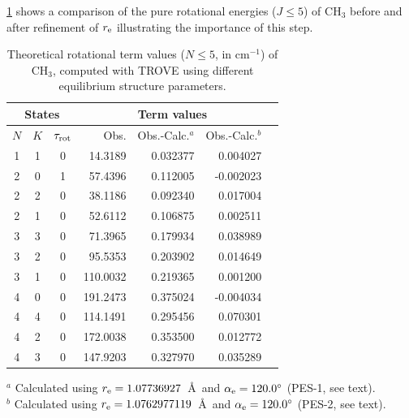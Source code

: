 \documentclass{achemso}
\newcommand{\3}{$_{3}$}
\newcommand{\cm}{cm$^{-1}$}
\begin{document}
\ref{t:rot:energies} shows a comparison of the pure rotational energies ($J\le 5$) of CH$_3$ before and after refinement of $r_{\rm e}$ illustrating the importance of this step.



\begin{table}
\caption{\label{t:rot:energies}  Theoretical rotational term
values ($N\le 5$, in \cm) of CH$_3$, computed with TROVE using different
equilibrium structure parameters.}
\begin{center}
\renewcommand{\arraystretch}{0.95}
\begin{tabular}{cccrrrr}
\hline
\hline
\multicolumn{3}{c}{States}  &   \multicolumn{3}{c}{Term values}          \\
\hline
$N$   &  $K$   &$\tau_{\rm rot}$ &  Obs. &  Obs.-Calc.$^a$& Obs.-Calc.$^b$ \\
\hline
1   &   1    &    0    &  14.3189 & 0.032377 &  0.004027 \\
2   &   0    &    1    &  57.4396 & 0.112005 & -0.002023 \\
2   &   2    &    0    &  38.1186 & 0.092340 &  0.017004 \\
2   &   1    &    0    &  52.6112 & 0.106875 &  0.002511 \\
3   &   3    &    0    &  71.3965 & 0.179934 &  0.038989 \\
3   &   2    &    0    &  95.5353 & 0.203902 &  0.014649 \\
3   &   1    &    0    & 110.0032 & 0.219365 &  0.001200 \\
4   &   0    &    0    & 191.2473 & 0.375024 & -0.004034 \\
4   &   4    &    0    & 114.1491 & 0.295456 &  0.070301 \\
4   &   2    &    0    & 172.0038 & 0.353500 &  0.012772 \\
4   &   3    &    0    & 147.9203 & 0.327970 &  0.035289 \\
\hline
\end{tabular}
\end{center}
\begin{flushleft}
\noindent \vspace*{0.1truecm}
$^a$ {Calculated using $r_{\rm e} = 1.07736927$~\AA\ and $\alpha_{\rm e}= 120.0^\circ$ (PES-1, see text).} \\
\noindent \vspace*{0.1truecm}
$^b$ {Calculated using $r_{\rm e} = 1.0762977119$~\AA\ and $\alpha_{\rm e}=120.0^\circ$ (PES-2, see text).}
\end{flushleft}
\end{table}
\end{document}
